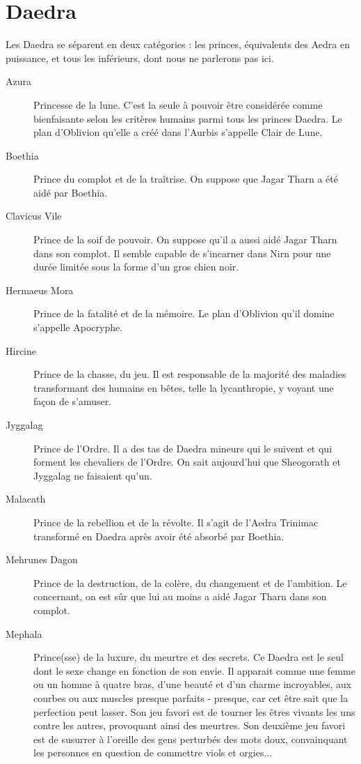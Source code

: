 \section{Daedra}

Les Daedra se séparent en deux catégories : les princes, équivalents des Aedra en puissance, et tous les inférieurs, dont nous ne parlerons pas ici.

\begin{description}
\item[Azura]
{
  Princesse de la lune. C'est la seule à pouvoir être considérée comme bienfaisante selon les critères humains parmi tous les princes Daedra. Le plan d'Oblivion qu'elle a créé dans l'Aurbis s'appelle Clair de Lune.
}
\item[Boethia]
{
  Prince du complot et de la traîtrise. On suppose que Jagar Tharn a été aidé par Boethia.
}
\item[Clavicus Vile]
{
  Prince de la soif de pouvoir. On suppose qu'il a aussi aidé Jagar Tharn dans son complot. Il semble capable de s'incarner dans Nirn pour une durée limitée sous la forme d'un gros chien noir.
}
\item[Hermaeus Mora]
{
  Prince de la fatalité et de la mémoire. Le plan d'Oblivion qu'il domine s'appelle Apocryphe.
}
\item[Hircine]
{
  Prince de la chasse, du jeu. Il est responsable de la majorité des maladies transformant des humains en bêtes, telle la lycanthropie, y voyant une façon de s'amuser.
}
\item[Jyggalag]
{
  Prince de l'Ordre. Il a des tas de Daedra mineurs qui le suivent et qui forment les chevaliers de l'Ordre. On sait aujourd'hui que Sheogorath et Jyggalag ne faisaient qu'un.
}
\item[Malacath]
{
  Prince de la rebellion et de la révolte. Il s'agit de l'Aedra Trinimac transformé en Daedra après avoir été absorbé par Boethia.
}
\item[Mehrunes Dagon]
{
  Prince de la destruction, de la colère, du changement et de l'ambition. Le concernant, on est sûr que lui au moins a aidé Jagar Tharn dans son complot.
}
\item[Mephala]
{
  Prince(sse) de la luxure, du meurtre et des secrets. Ce Daedra est le seul dont le sexe change en fonction de son envie. Il apparait comme une femme ou un homme à quatre bras, d'une beauté et d'un charme incroyables, aux courbes ou aux muscles presque parfaits - presque, car cet être sait que la perfection peut lasser. Son jeu favori est de tourner les êtres vivants les uns contre les autres, provoquant ainsi des meurtres. Son deuxième jeu favori est de susurrer à l'oreille des gens perturbés des mots doux, convainquant les personnes en question de commettre viols et orgies...
}
\end{description}

